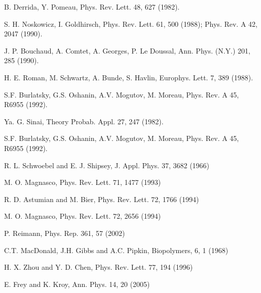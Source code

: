 \documentclass[aps,pre,floats,floatfix,twocolumn]{revtex4}
\begin{document}
\vspace*{1cm}

\begin{thebibliography}{99}

B. Derrida, Y. Pomeau, 
Phys. Rev. Lett. 48, 627 (1982).

S. H. Noskowicz, I. Goldhirsch,
Phys. Rev. Lett. 61, 500 (1988); 
Phys. Rev. A 42, 2047 (1990). 

J. P. Bouchaud, A. Comtet, A. Georges, P. Le Doussal,
Ann. Phys. (N.Y.) 201, 285 (1990).

H. E. Roman, M. Schwartz, A. Bunde, S. Havlin, 
Europhys. Lett. 7, 389 (1988). 

S.F. Burlatsky, G.S. Oshanin, A.V. Mogutov, M. Moreau,   
Phys. Rev. A 45, R6955 (1992). 

Ya. G. Sinai, 
Theory Probab. Appl. 27, 247 (1982).

S.F. Burlatsky, G.S. Oshanin, A.V. Mogutov, M. Moreau,   
Phys. Rev. A 45, R6955 (1992). 



R. L. Schwoebel and E. J. Shipsey, J. Appl. Phys. 37, 3682 (1966) 

M. O. Magnasco, Phys. Rev. Lett. 71, 1477 (1993) 

R. D. Astumian and M. Bier, Phys. Rev. Lett. 72, 1766 (1994)

M. O. Magnasco, Phys. Rev. Lett. 72, 2656 (1994)

P. Reimann, Phys. Rep. 361, 57 (2002)

C.T. MacDonald, J.H. Gibbs and A.C. Pipkin, Biopolymers, 6, 1 (1968)

H. X. Zhou and Y. D. Chen, Phys. Rev. Lett. 77, 194 (1996) 

E. Frey and K. Kroy, Ann. Phys. 14, 20 (2005)


\end{thebibliography}
\end{document}

